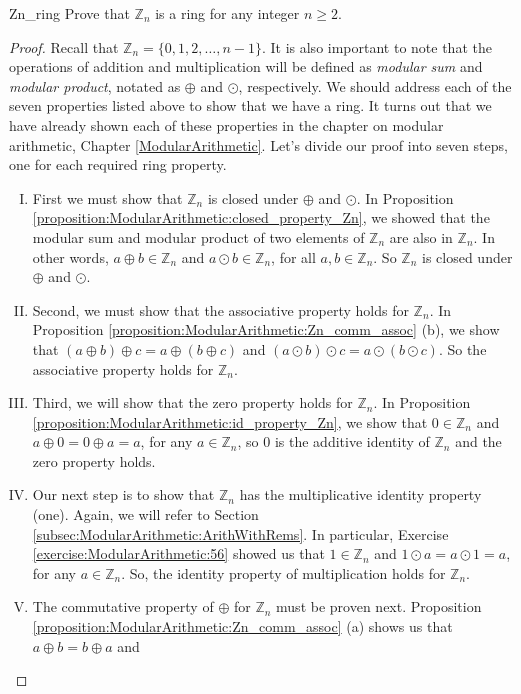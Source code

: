\begin{example}{Zn_ring}
Prove that ${\mathbb Z}_n$ is a ring for any integer $n \ge 2$.

\begin{proof}
Recall that ${\mathbb Z}_n=\{0,1,2,\ldots,n-1\}$.  It is also important to note that the operations of addition and multiplication will be defined as \emph{modular sum} and \emph{modular product}, notated as $\oplus$ and $\odot$, respectively.  We should address each of the seven properties listed above to show that we have a ring.  It turns out that we have already shown each of these properties in the chapter on modular arithmetic, Chapter \ref{ModularArithmetic}.  Let's divide our proof into seven steps, one for each required ring property.
\begin{enumerate}[(I)]
\item First we must show that ${\mathbb Z}_n$ is closed under $\oplus$ and $\odot$.  In Proposition \ref{proposition:ModularArithmetic:closed_property_Zn}, we showed that the modular sum and modular product of two elements of  ${\mathbb Z}_n$ are also in ${\mathbb Z}_n$. In other words, $a\oplus b \in{\mathbb Z}_n$ and $a\odot b\in{\mathbb Z}_n$, for all $a,b\in{\mathbb Z}_n$.  So ${\mathbb Z}_n$ is closed under $\oplus$ and $\odot$.
\item Second, we must show that the associative property holds for ${\mathbb Z}_n$.  In Proposition \ref{proposition:ModularArithmetic:Zn_comm_assoc} (b), we show that $(a \oplus b) \oplus c  =  a \oplus (b \oplus c)$ and $(a \odot b) \odot c    =  a \odot (b \odot c)$.  So the associative property holds for ${\mathbb Z}_n$.
\item Third, we will show that the zero property holds for ${\mathbb Z}_n$. In Proposition \ref{proposition:ModularArithmetic:id_property_Zn}, we show that $0 \in {\mathbb Z}_n$ and $a\oplus 0=0\oplus a=a$, for any $a\in{\mathbb Z}_n$, so $0$ is the additive identity of ${\mathbb Z}_n$ and the zero property holds.
\item Our next step is to show that ${\mathbb Z}_n$ has the multiplicative identity property (one).  Again, we will refer to Section \ref{subsec:ModularArithmetic:ArithWithRems}.  In particular, Exercise \ref{exercise:ModularArithmetic:56} showed us that $1\in{\mathbb Z}_n$ and $1\odot a=a\odot 1=a$, for any $a\in{\mathbb Z}_n$.  So, the identity property of multiplication holds for ${\mathbb Z}_n$.
\item The commutative property of $\oplus$ for ${\mathbb Z}_n$ must be proven next.  Proposition \ref{proposition:ModularArithmetic:Zn_comm_assoc} (a) shows us that $a \oplus b   =  b \oplus a$ and

\end{enumerate}
\end{proof}
\end{example}
